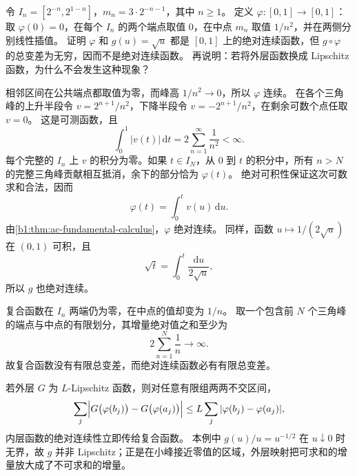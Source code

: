\begin{exercise}\label{b1:ex:16-ac-composition-failure}
令 \(I_n=[2^{-n},2^{1-n}]\)，\(m_n=3\cdot2^{-n-1}\)，其中 \(n\ge1\)。
定义 \(\varphi:[0,1]\to[0,1]\)：取 \(\varphi(0)=0\)，在每个 \(I_n\) 的两个端点取值 \(0\)，在中点 \(m_n\) 取值 \(1/n^2\)，并在两侧分别线性插值。
证明 \(\varphi\) 和 \(g(u)=\sqrt u\) 都是 \([0,1]\) 上的绝对连续函数，但 \(g\circ\varphi\) 的总变差为无穷，因而不是绝对连续函数。
再说明：若将外层函数换成 Lipschitz 函数，为什么不会发生这种现象？
\end{exercise}
\begin{solution}
相邻区间在公共端点都取值为零，而峰高 \(1/n^2\to0\)，所以 \(\varphi\) 连续。
在各个三角峰的上升半段令 \(v=2^{n+1}/n^2\)，下降半段令 \(v=-2^{n+1}/n^2\)，在剩余可数个点任取 \(v=0\)。
这是可测函数，且
\[
 \int_0^1|v(t)|\,\mathrm dt=2\sum_{n=1}^{\infty}\frac1{n^2}<\infty.
\]
每个完整的 \(I_n\) 上 \(v\) 的积分为零。如果 \(t\in I_N\)，从 \(0\) 到 \(t\) 的积分中，所有 \(n>N\) 的完整三角峰贡献相互抵消，余下的部分恰为 \(\varphi(t)\)。
绝对可积性保证这次可数求和合法，因而
\[
 \varphi(t)=\int_0^t v(u)\,\mathrm du.
\]
由\cref{b1:thm:ac-fundamental-calculus}，\(\varphi\) 绝对连续。
同样，函数 \(u\mapsto1/(2\sqrt u)\) 在 \((0,1)\) 可积，且
\[
 \sqrt t=\int_0^t\frac{\mathrm du}{2\sqrt u},
\]
所以 \(g\) 也绝对连续。

复合函数在 \(I_n\) 两端仍为零，在中点的值却变为 \(1/n\)。
取一个包含前 \(N\) 个三角峰的端点与中点的有限划分，其增量绝对值之和至少为
\[
 2\sum_{n=1}^N\frac1n\longrightarrow\infty.
\]
故复合函数没有有限总变差，而绝对连续函数必有有限总变差。

若外层 \(G\) 为 \(L\)-Lipschitz 函数，则对任意有限组两两不交区间，
\[
 \sum_j\Bigl|G\bigl(\varphi(b_j)\bigr)-G\bigl(\varphi(a_j)\bigr)\Bigr|
 \le L\sum_j|\varphi(b_j)-\varphi(a_j)|,
\]
内层函数的绝对连续性立即传给复合函数。
本例中 \(g(u)/u=u^{-1/2}\) 在 \(u\downarrow0\) 时无界，故 \(g\) 并非 Lipschitz；正是在小峰接近零值的区域，外层映射把可求和的增量放大成了不可求和的增量。
\end{solution}

